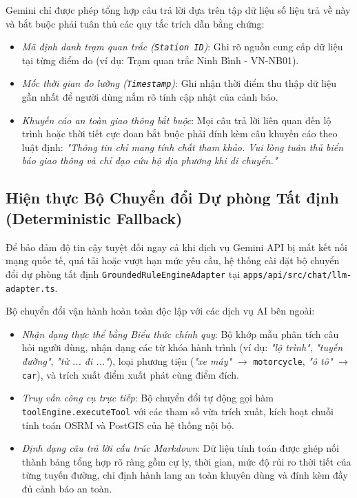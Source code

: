 Gemini chỉ được phép tổng hợp câu trả lời dựa trên tập dữ liệu số liệu trả về này và bắt buộc phải tuân thủ các quy tắc trích dẫn bằng chứng:
\begin{itemize}
    \item[-] \textit{Mã định danh trạm quan trắc (\texttt{Station ID})}: Ghi rõ nguồn cung cấp dữ liệu tại từng điểm đo (ví dụ: Trạm quan trắc Ninh Bình - VN-NB01).
    \item[-] \textit{Mốc thời gian đo lường (\texttt{Timestamp})}: Ghi nhận thời điểm thu thập dữ liệu gần nhất để người dùng nắm rõ tính cập nhật của cảnh báo.
    \item[-] \textit{Khuyến cáo an toàn giao thông bắt buộc}: Mọi câu trả lời liên quan đến lộ trình hoặc thời tiết cực đoan bắt buộc phải đính kèm câu khuyến cáo theo luật định: \textit{"Thông tin chỉ mang tính chất tham khảo. Vui lòng tuân thủ biển báo giao thông và chỉ đạo cứu hộ địa phương khi di chuyển."}
\end{itemize}

\subsection{Hiện thực Bộ Chuyển đổi Dự phòng Tất định (Deterministic Fallback)}
Để bảo đảm độ tin cậy tuyệt đối ngay cả khi dịch vụ Gemini API bị mất kết nối mạng quốc tế, quá tải hoặc vượt hạn mức yêu cầu, hệ thống cài đặt bộ chuyển đổi dự phòng tất định \texttt{GroundedRuleEngineAdapter} tại \texttt{apps/api/src/chat/}\allowbreak\texttt{llm-}\allowbreak\texttt{adapter.ts}. 

Bộ chuyển đổi vận hành hoàn toàn độc lập với các dịch vụ AI bên ngoài:
\begin{itemize}
    \item[-] \textit{Nhận dạng thực thể bằng Biểu thức chính quy}: Bộ khớp mẫu phân tích câu hỏi người dùng, nhận dạng các từ khóa hành trình (ví dụ: \textit{"lộ trình"}, \textit{"tuyến đường"}, \textit{"từ ... đi ..."}), loại phương tiện (\textit{"xe máy"} $\to$ \texttt{motorcycle}, \textit{"ô tô"} $\to$ \texttt{car}), và trích xuất điểm xuất phát cùng điểm đích.
    \item[-] \textit{Truy vấn công cụ trực tiếp}: Bộ chuyển đổi tự động gọi hàm \texttt{toolEngine.executeTool} với các tham số vừa trích xuất, kích hoạt chuỗi tính toán OSRM và PostGIS của hệ thống nội bộ.
    \item[-] \textit{Định dạng câu trả lời cấu trúc Markdown}: Dữ liệu tính toán được ghép nối thành bảng tổng hợp rõ ràng gồm cự ly, thời gian, mức độ rủi ro thời tiết của từng tuyến đường, chỉ định hành lang an toàn khuyên dùng và đính kèm đầy đủ cảnh báo an toàn.
\end{itemize}

